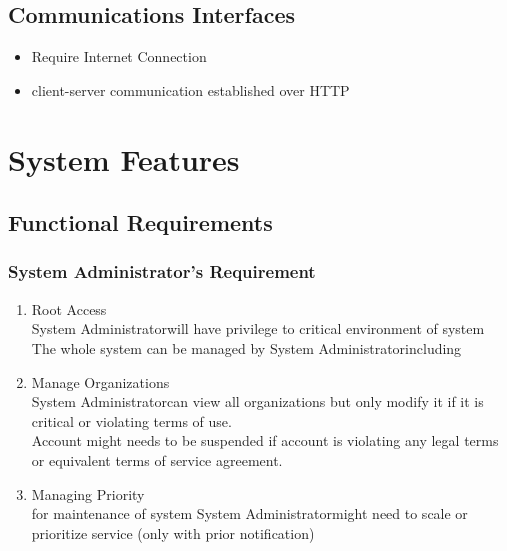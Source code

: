 \documentclass{scrreprt}
\def\superuser{System Administrator}
\begin{document}
\section{Communications Interfaces}
\begin{itemize}
	\item Require Internet Connection
	\item client-server communication established over HTTP
\end{itemize}

\chapter{System Features}
\section{Functional Requirements}
\label{functions}

\subsection{\superuser's Requirement}
\begin{enumerate}[start=1,label={\bfseries REQ \arabic*:}]
	\addtolength{\itemindent}{40pt}
	\item Root Access
		\\ \superuser \space will have privilege to critical environment of system
		\\ The whole system can be managed by \superuser \space including 
	\item Manage Organizations
		\\ \superuser \space can view all organizations but only modify it if it is critical or violating terms of use.
		\\ Account might needs to be suspended if account is violating any legal terms or equivalent terms of service agreement.
	\item Managing Priority
		\\ for maintenance of system \superuser \space might need to scale or prioritize service (only with prior notification)
		
	
\end{enumerate}
\end{document}
